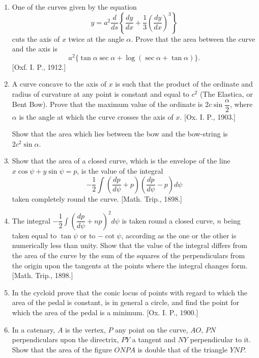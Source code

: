 \documentclass[11pt, a4paper]{article}
\newcommand{\source}[1]{\hfill\textnormal{[#1]}}
\begin{document}
\begin{enumerate}[leftmargin=2em]
Show that if the area of the oval curve, of the locus of the centre of the circle and of the envelope of the circle be $S_0$, $S_1$, $S_2$ respectively,
\[
A_2-2A_1+A_0=S_2-2S_1+S_0.
\]
\source{Trinity, 1878.}

\item One of the curves given by the equation
\[
y=a^2\frac{d}{ds}\left\{\frac{dy}{dx}+\frac13\left(\frac{dy}{dx}\right)^3\right\}
\]
cuts the axis of $x$ twice at the angle $\alpha$. Prove that the area between the curve and the axis is
\[
a^2\{\tan\alpha\sec\alpha+\log(\sec\alpha+\tan\alpha)\}.
\]
\source{Oxf. I. P., 1912.}

\item A curve concave to the axis of $x$ is such that the product of the ordinate and radius of curvature at any point is constant and equal to $c^2$ (The Elastica, or Bent Bow). Prove that the maximum value of the ordinate is $2c\sin\dfrac{\alpha}{2}$, where $\alpha$ is the angle at which the curve crosses the axis of $x$. \source{Ox. I. P., 1903.}

Show that the area which lies between the bow and the bow-string is $2c^2\sin\alpha$.

\item Show that the area of a closed curve, which is the envelope of the line $x\cos\psi+y\sin\psi=p$, is the value of the integral
\[
-\frac12\int\left(\frac{dp}{d\psi}+p\right)\left(\frac{dp}{d\psi}-p\right)d\psi
\]
taken completely round the curve. \source{Math. Trip., 1898.}

\item The integral $-\dfrac12\displaystyle\int\left(\dfrac{dp}{d\psi}+np\right)^2d\psi$ is taken round a closed curve, $n$ being taken equal to $\tan\psi$ or to $-\cot\psi$, according as the one or the other is numerically less than unity. Show that the value of the integral differs from the area of the curve by the sum of the squares of the perpendiculars from the origin upon the tangents at the points where the integral changes form. \source{Math. Trip., 1898.}

\item In the cycloid prove that the conic locus of points with regard to which the area of the pedal is constant, is in general a circle, and find the point for which the area of the pedal is a minimum. \source{Ox. I. P., 1900.}

\item In a catenary, $A$ is the vertex, $P$ any point on the curve, $AO$, $PN$ perpendiculars upon the directrix, $PY$ a tangent and $NY$ perpendicular to it. Show that the area of the figure $ONPA$ is double that of the triangle $YNP$.


\end{enumerate}
\end{document}
